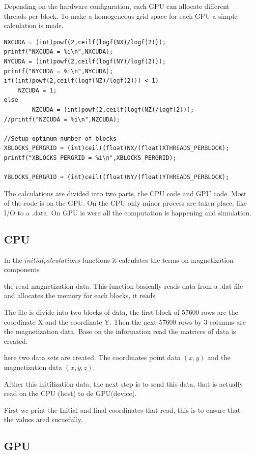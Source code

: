 Depending on the hardware configuration, each GPU can allocate different threads per block. To make a homogeneous grid space for each GPU a simple calculation is made.

\begin{lstlisting}[frame=none]
NXCUDA = (int)powf(2,ceilf(logf(NX)/logf(2)));
printf("NXCUDA = %i\n",NXCUDA);
NYCUDA = (int)powf(2,ceilf(logf(NY)/logf(2)));
printf("NYCUDA = %i\n",NYCUDA);
if((int)powf(2,ceilf(logf(NZ)/logf(2))) < 1)
	NZCUDA = 1;
else
        NZCUDA = (int)powf(2,ceilf(logf(NZ)/logf(2)));
//printf("NZCUDA = %i\n",NZCUDA);

//Setup optimum number of blocks
XBLOCKS_PERGRID = (int)ceil((float)NX/(float)XTHREADS_PERBLOCK); 
printf("XBLOCKS_PERGRID = %i\n",XBLOCKS_PERGRID);

YBLOCKS_PERGRID = (int)ceil((float)NY/(float)YTHREADS_PERBLOCK); 
\end{lstlisting}


The calculations are divided into two parts, the CPU code and GPU code. Most of the code is on the GPU. On the CPU only minor  process are taken place, like I/O to a .data.
On GPU is were all the computation is happening and simulation.

\subsection{CPU}
In the $initial_calculations$ functions it calculates the terms on magnetization components


the read magnetization data.
This function basically reads data from a .dat file and allocates the memory for each blocks, it reads

The file is divide into two blocks of data, the first block of 57600 rows are the coordinate X and the coordinate Y. Then the next 57600 rows by 3 columns are the magnetization data. Base on the information read the matrices of data is created.

here two data sets are created. The coordinates point data $(x,y)$ and the magnetization data $(x, y, z)$.

Afther this initilization data, the next step is to send this data, that is actually read on the CPU (host) to de GPU(device). 


First we print the Initial and final coordinates that read, this is to ensure that the values ared sucuefully.


\subsection{GPU}


